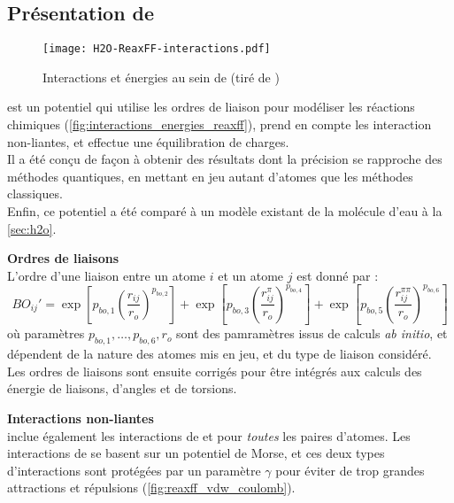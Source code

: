     \subsection{Présentation de \reaxff{}} \label{sec:reaxff}

\begin{figure}[h!]
    \centering
    \texttt{[image: H2O-ReaxFF-interactions.pdf]}
    \caption{Interactions et énergies au sein de \reaxff{} (tiré de \cite{russo_atomistic-scale_2011})}
    \label{fig:interactions_energies_reaxff}
\end{figure}

\reaxff{}\cite{russo_atomistic-scale_2011}\cite{senftle_reaxff_2016} est un potentiel qui utilise les ordres de liaison pour modéliser les réactions chimiques (\autoref{fig:interactions_energies_reaxff}), prend en compte les interaction non-liantes, et effectue  une équilibration de charges.\\
Il a été conçu de façon à obtenir des résultats dont la précision se rapproche des méthodes quantiques, en mettant en jeu autant d'atomes que les méthodes classiques.\\
Enfin, ce potentiel a été comparé à un modèle existant de la molécule d'eau à la \autoref{sec:h2o}.

\textbf{Ordres de liaisons}\\
L'ordre d'une liaison entre un atome $i$ et un atome $j$ est donné par :
\begin{equation}
    BO_{ij}' = \exp \left[p_{bo, 1} \left(\frac{r_{ij}}{r_o}\right)^{p_{bo,2}}\right] + \exp \left[p_{bo,3} \left(\frac{r_{ij}^\pi}{r_o}\right)^{p_{bo,4}}\right] + \exp \left[p_{bo,5} \left(\frac{r_{ij}^{\pi\pi}}{r_o}\right)^{p_{bo,6}}\right]
    \label{eq:ordres_liaisons_reaxff}
\end{equation}
où paramètres $p_{bo,1}, \dots, p_{bo,6}, r_o$ sont des pamramètres issus de calculs \textit{ab initio}, et dépendent de la nature des atomes mis en jeu, et du type de liaison considéré. Les ordres de liaisons sont ensuite corrigés pour être intégrés aux calculs des énergie de liaisons, d'angles et de torsions.

\textbf{Interactions non-liantes}\\
\reaxff{} inclue également les interactions de \vdw{} et \coulomb{} pour \emph{toutes} les paires d'atomes. Les interactions de \vdw{} se basent sur un potentiel de Morse, et ces deux types d'interactions sont protégées par un paramètre $\gamma$ pour éviter de trop grandes attractions et répulsions (\autoref{fig:reaxff_vdw_coulomb}).

